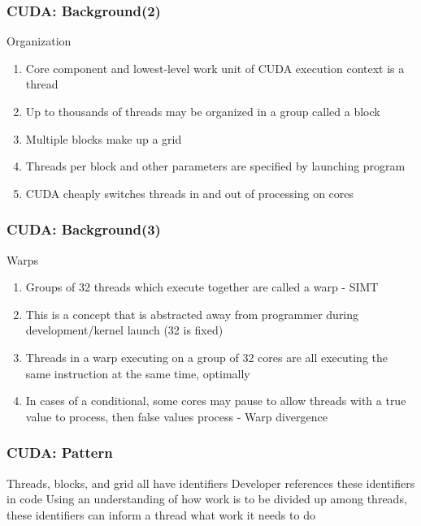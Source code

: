 \documentclass[10pt, xcolor={dvipsnames}, aspectratio=169]{beamer}
\begin{document}
\begin{frame}
\frametitle{CUDA: Background(2)}
Organization
\begin{enumerate}
	\item Core component and lowest-level work unit of CUDA execution context is a thread
	\item Up to thousands of threads may be organized in a group called a block
	\item Multiple blocks make up a grid
	\item Threads per block and other parameters are specified by launching program
	\item CUDA cheaply switches threads in and out of processing on cores
\end{enumerate}
\end{frame}

\begin{frame}
	\frametitle{CUDA: Background(3)}
	Warps
	\begin{enumerate}
		\item Groups of 32 threads which execute together are called a warp - SIMT
		\item This is a concept that is abstracted away from programmer during development/kernel launch (32 is fixed)
		\item Threads in a warp executing on a group of 32 cores are all executing the same instruction at the same time, optimally
		\item In cases of a conditional, some cores may pause to allow threads with a true value to process, then false values process - Warp divergence
	\end{enumerate}
\end{frame}

\begin{frame}
\frametitle{CUDA: Pattern}

Threads, blocks, and grid all have identifiers
\newline\newline
Developer references these identifiers in code
\newline\newline
Using an understanding of how work is to be divided up among threads, these identifiers can inform a thread what work it needs to do

\end{frame}
\end{document}
